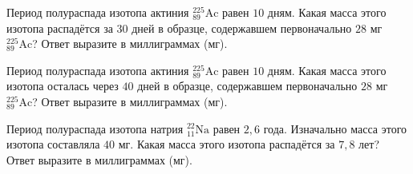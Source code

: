 
\begin{taskbasic}[code={\label{task:nuclear_decay_actinium_30d}}]
Период полураспада изотопа актиния $^{225}_{89}\text{Ac}$ равен $10\text{ дням}$. Какая масса этого изотопа распадётся за $30\text{ дней}$ в образце, содержавшем первоначально $28\text{ мг}$ $^{225}_{89}\text{Ac}$? Ответ выразите в миллиграммах (мг).

\end{taskbasic}

\begin{taskbasic}[code={\label{task:nuclear_decay_actinium_40d}}]
Период полураспада изотопа актиния $^{225}_{89}\text{Ac}$ равен $10\text{ дням}$. Какая масса этого изотопа осталась через $40\text{ дней}$ в образце, содержавшем первоначально $28\text{ мг}$ $^{225}_{89}\text{Ac}$? Ответ выразите в миллиграммах (мг).

\end{taskbasic}

\begin{taskbasic}[code={\label{task:nuclear_decay_sodium_decayed}}]
Период полураспада изотопа натрия $^{22}_{11}\text{Na}$ равен $2{,}6\text{ года}$. Изначально масса этого изотопа составляла $40\text{ мг}$. Какая масса этого изотопа распадётся за $7{,}8\text{ лет}$? Ответ выразите в миллиграммах (мг).

\end{taskbasic}


